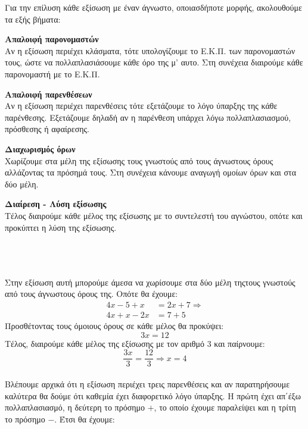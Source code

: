 \documentclass[twoside,nofonts,internet,methodoi]{thewria}
\begin{document}
\begin{Methodos}
Για την επίλυση κάθε εξίσωση με έναν άγνωστο, οποιασδήποτε μορφής, ακολουθούμε τα εξής βήματα:
\begin{bhma}
\item \textbf{Απαλοιφή παρονομαστών}\\
Αν η εξίσωση περιέχει κλάσματα, τότε υπολογίζουμε το Ε.Κ.Π. των παρονομαστών τους, ώστε να πολλαπλασιάσουμε κάθε όρο της μ' αυτο. Στη συνέχεια διαιρούμε κάθε παρονομαστή με το Ε.Κ.Π.
\item \textbf{Απαλοιφή παρενθέσεων}\\
Αν η εξίσωση περιέχει παρενθέσεις τότε εξετάζουμε το λόγο ύπαρξης της κάθε παρένθεσης. Εξετάζουμε δηλαδή αν η παρένθεση υπάρχει λόγω πολλαπλασιασμού, πρόσθεσης ή αφαίρεσης.
\item \textbf{Διαχωρισμός όρων}\\
Χωρίζουμε στα μέλη της εξίσωσης τους γνωστούς από τους άγνωστους όρους αλλάζοντας τα πρόσημά τους. Στη συνέχεια κάνουμε αναγωγή ομοίων όρων και στα δύο μέλη.
\item \textbf{Διαίρεση - Λύση εξίσωσης}\\
Τέλος διαιρούμε κάθε μέλος της εξίσωσης με το συντελεστή του αγνώστου, οπότε και προκύπτει η λύση της εξίσωσης.
\end{bhma}
\end{Methodos}
\\\\
\lysh\\
Στην εξίσωση αυτή μπορούμε άμεσα να χωρίσουμε στα δύο μέλη τηςτους γνωστούς από τους άγνωστους όρους της. Οπότε θα έχουμε:
\begin{align*}
4x-5+x&=2x+7\Rightarrow\\
4x+x-2x&=7+5
\end{align*}
Προσθέτοντας τους όμοιους όρους σε κάθε μέλος θα προκύψει:
\[ 3x=12 \]
Τέλος, διαιρούμε κάθε μέλος της εξίσωσης με τον αριθμό $ 3 $ και παίρνουμε:
\[ \frac{3x}{3}=\frac{12}{3}\Rightarrow x=4 \]
\lysh\\
Βλέπουμε αρχικά ότι η εξίσωση περιέχει τρεις παρενθέσεις και αν παρατηρήσουμε καλύτερα θα δούμε ότι καθεμία έχει διαφορετικό λόγο ύπαρξης. Η πρώτη έχει απ΄έξω πολλαπλασιασμό, η δεύτερη το πρόσημο $ + $, το οποίο έχουμε παραλείψει και η τρίτη το πρόσημο $ - $. Έτσι θα έχουμε:
\end{document}
